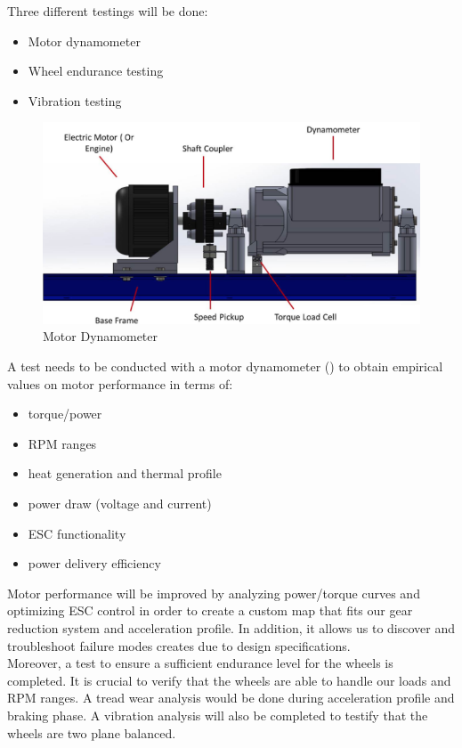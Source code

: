 \documentclass[main.tex]{subfiles}
\begin{document}
    Three different testings will be done:
    \begin{itemize}
        \item Motor dynamometer
        \item Wheel endurance testing
        \item Vibration testing
    \end{itemize}

   \begin{figure}
		\centering
       \includegraphics[width=0.5\linewidth]{images/motordyna}
       \caption{Motor Dynamometer}
       \label{fig:motordyna}
   \end{figure}
    A test needs to be conducted with a motor dynamometer () to obtain empirical values on motor performance in terms of:
    
    \begin{itemize}
        \item torque/power
        \item RPM ranges
        \item heat generation and thermal profile
        \item power draw (voltage and current)
        \item ESC functionality
        \item power delivery efficiency
    \end{itemize}
    
    Motor performance will be improved by analyzing power/torque curves and optimizing ESC control in order to create a custom map that fits our gear reduction system and acceleration profile. In addition, it allows us to discover and troubleshoot failure modes creates due to design specifications.\\
    
    Moreover, a test to ensure a sufficient endurance level for the wheels is completed. It is crucial to verify that the wheels are able to handle our loads and RPM ranges. A tread wear analysis would be done during acceleration profile and braking phase. A vibration analysis will also be completed to testify that the wheels are two plane balanced.\\
\end{document}
